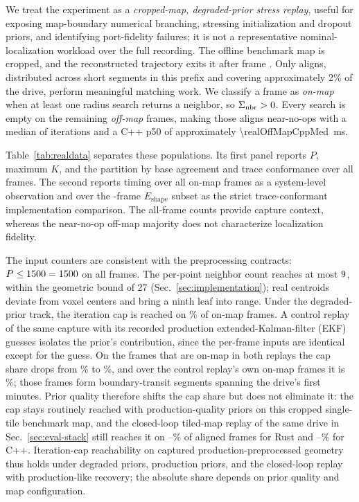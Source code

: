 We treat the experiment as a \emph{cropped-map, degraded-prior stress replay}, useful for
exposing map-boundary numerical branching, stressing initialization and dropout priors,
and identifying port-fidelity failures; it is not a representative nominal-localization
workload over the full recording. The offline benchmark map is cropped, and the
reconstructed trajectory exits it after frame \realOnMapSeqMax{}. Only \realOnMap{}
aligns, distributed across \realSegments{} short
segments in this prefix and covering approximately 2\% of the drive, perform meaningful
matching work. We classify a frame as \emph{on-map} when at least one radius search returns
a neighbor, so $\Sigma_{\mathrm{nbr}}>0$. Every search is empty on the remaining \realOffMap{}
\emph{off-map} frames, making those aligns near-no-ops with a median of
\realOffMapIterMed{} iterations and a C++ p50 of approximately
\SI{\realOffMapCppMed}{ms}.

Table~\ref{tab:realdata} separates these populations. Its first panel reports $P$, maximum
$K$, and the partition by base agreement and trace conformance over all frames. The second reports timing over
all \realOnMap{} on-map frames as a system-level observation and over the
\realShapeOnMap{}-frame $E_{\mathrm{shape}}$ subset as the strict trace-conformant
implementation comparison. The all-frame counts provide capture context, whereas the
near-no-op off-map majority does not characterize localization fidelity.



The input counters are consistent with the preprocessing contracts: $P\le1500=1500$
on all \realFrames{} frames. The per-point neighbor count reaches at most
$9$, within the geometric bound of 27 (Sec.~\ref{sec:implementation}); real
centroids deviate from voxel centers and bring a ninth leaf into range. Under the
degraded-prior track, the
iteration cap is reached on \realIterCapPct\% of on-map frames. A control replay of the
same capture with its recorded production extended-Kalman-filter (EKF) guesses isolates the
prior's contribution, since the per-frame inputs are identical except for the guess. On the
\realABCommonN{} frames that are
on-map in both replays the cap share drops from \realABCapDegPct\% to \realABCapProdPct\%,
and over the control replay's own \realProdOnMap{} on-map frames it is
\realProdIterCapPct\%; those frames form \realProdOnMapSegments{} boundary-transit segments
spanning the drive's first \realProdOnMapSpanMin{} minutes. Prior quality therefore
shifts the cap share but does not eliminate it: the cap stays routinely reached with
production-quality priors on this cropped single-tile benchmark map, and the closed-loop
tiled-map replay of the same drive in Sec.~\ref{sec:eval-stack} still reaches it on
\stackRustCapMin--\stackRustCapMax\% of aligned frames for Rust and
\stackCppCapMin--\stackCppCapMax\% for C++. Iteration-cap reachability on captured
production-preprocessed geometry thus holds under degraded priors, production priors, and
the closed-loop replay with production-like recovery; the absolute share depends on prior
quality and map configuration.

